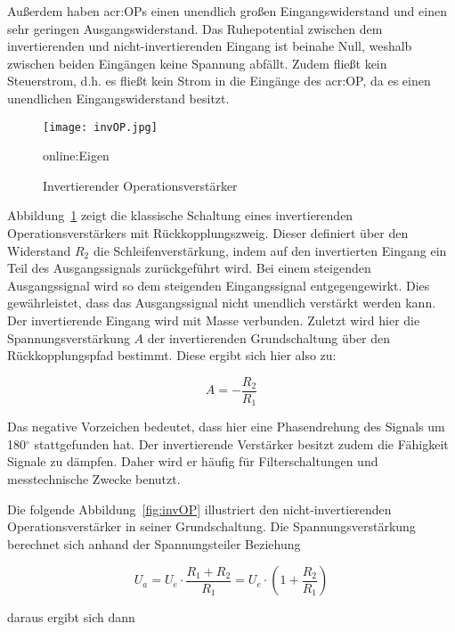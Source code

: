 Außerdem haben \gls{acr:OP}s einen unendlich großen Eingangswiderstand und einen sehr geringen Ausgangswiderstand.
Das Ruhepotential zwischen dem invertierenden und nicht-invertierenden Eingang ist beinahe Null, weshalb zwischen beiden Eingängen keine Spannung abfällt.\cite{tietzeElectronicCircuits2008} Zudem fließt kein Steuerstrom, d.h. es fließt kein Strom in die Eingänge des \gls{acr:OP}, da es einen unendlichen Eingangswiderstand besitzt.\cite{OP}

\begin{figure}[H]
	\centering
	\texttt{[image: invOP.jpg]}
	\caption[Invertierender Operationsverstärker]{Invertierender Operationsverstärker} 
	\gls{online:Eigen}
	\label{fig:ninvOP}
\end{figure}

Abbildung~\ref{fig:ninvOP} zeigt die klassische Schaltung eines invertierenden Operationsverstärkers mit
Rückkopplungszweig. Dieser definiert über den Widerstand $R_{2}$ die Schleifenverstärkung, indem auf den invertierten Eingang ein Teil des Ausgangssignals zurückgeführt wird.  Bei einem steigenden Ausgangssignal wird so dem steigenden Eingangssignal entgegengewirkt. Dies gewährleistet, dass das Ausgangssignal nicht unendlich verstärkt werden kann. Der invertierende Eingang wird mit Masse verbunden. Zuletzt wird hier die Spannungsverstärkung $A$ der invertierenden Grundschaltung über den Rückkopplungspfad bestimmt. Diese ergibt sich hier also zu: 

\begin{equation}
	\label{equ:bsp1}
	A = - \frac{R_{2}}{R_{1}}
\end{equation}

Das negative Vorzeichen bedeutet, dass hier eine Phasendrehung des Signals um 180$^\circ$ stattgefunden hat. Der invertierende Verstärker besitzt zudem die Fähigkeit Signale zu dämpfen. Daher wird er häufig für Filterschaltungen und messtechnische Zwecke benutzt. 

Die folgende Abbildung~\ref{fig:invOP} illustriert den nicht-invertierenden Operationsverstärker in seiner Grundschaltung. Die Spannungsverstärkung berechnet sich anhand der Spannungsteiler Beziehung

\begin{equation}
	\label{equ:bsp1}
	U_{a} = U_{e} \cdot \frac{R_{1} + R_{2}}{R_{1}} = U_{e} \cdot (1+ \frac{R_{2}}{R_{1}})
\end{equation}

daraus ergibt sich dann

